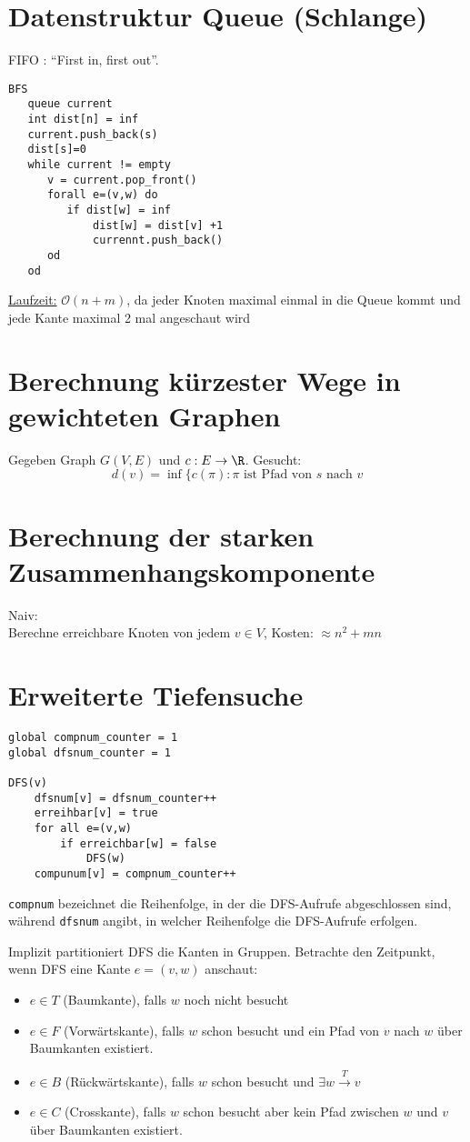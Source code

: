 \documentclass{mycourse}
\begin{document}
\section{Datenstruktur Queue (Schlange)}
FIFO : “First in, first out”.

\begin{verbatim}
BFS
   queue current
   int dist[n] = inf
   current.push_back(s)
   dist[s]=0
   while current != empty
      v = current.pop_front()
      forall e=(v,w) do
         if dist[w] = inf
             dist[w] = dist[v] +1
             currennt.push_back()
      od
   od
\end{verbatim}

\underline{Laufzeit:}
$\mathcal O(n+m)$, da jeder Knoten maximal einmal in die Queue kommt und jede Kante maximal 2 mal angeschaut wird

\section{Berechnung kürzester Wege in gewichteten Graphen}
Gegeben Graph $G(V,E)$ und $c:E\to \R$.
Gesucht:\\
\[
d(v)=\inf\{c(\pi):\pi \text{ ist Pfad von $s$ nach $v$}
\]

\section{Berechnung der starken Zusammenhangskomponente}
Naiv:\\
Berechne erreichbare Knoten von jedem $v\in V$, Kosten: $\approx n^2+mn$

\section{Erweiterte Tiefensuche}

\begin{verbatim}
global compnum_counter = 1
global dfsnum_counter = 1

DFS(v)
    dfsnum[v] = dfsnum_counter++
    erreihbar[v] = true
    for all e=(v,w)
        if erreichbar[w] = false
            DFS(w)
    compunum[v] = compnum_counter++
\end{verbatim}

\verb|compnum| bezeichnet die Reihenfolge, in der die DFS-Aufrufe abgeschlossen sind, während \verb|dfsnum| angibt, in welcher Reihenfolge die DFS-Aufrufe erfolgen.

Implizit partitioniert DFS die Kanten in Gruppen.
Betrachte den Zeitpunkt, wenn DFS eine Kante $e=(v,w)$ anschaut:
\begin{itemize}
\item $e\in T$ (Baumkante), falls $w$ noch nicht besucht
\item $e\in F$ (Vorwärtskante), falls $w$ schon besucht und ein Pfad von $v$ nach $w$ über Baumkanten existiert.
\item $e\in B$ (Rückwärtskante), falls $w$ schon besucht und $\exists w\stackrel{T}\to v$
\item $e\in C$ (Crosskante), falls $w$ schon besucht aber kein Pfad zwischen $w$ und $v$ über Baumkanten existiert.
\end{itemize}
\end{document}
